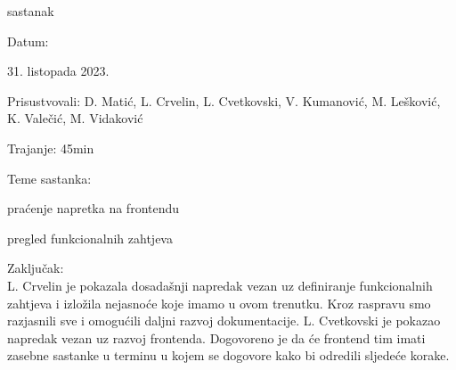 \begin{packed_enum}
            \item  sastanak
			\item[] \begin{packed_item}
				\item Datum: \date[{31. listopada 2023.}
				\item Prisustvovali:  D. Matić, L. Crvelin, L. Cvetkovski, V. Kumanović, M. Lešković, K. Valečić, M. Vidaković
				\item Trajanje: 45min
				\item Teme sastanka:
				\begin{packed_item}
					\item  praćenje napretka na frontendu
					\item  pregled funkcionalnih zahtjeva
				\end{packed_item}
                \item Zaključak: \\
                L. Crvelin je pokazala dosadašnji napredak vezan uz definiranje funkcionalnih zahtjeva i izložila nejasnoće koje imamo u ovom trenutku. Kroz raspravu smo razjasnili sve i omogućili daljni razvoj dokumentacije.
                L. Cvetkovski je pokazao napredak vezan uz razvoj frontenda. Dogovoreno je da će frontend tim imati zasebne sastanke u terminu u kojem se dogovore kako bi odredili sljedeće korake.
            
			\end{packed_item}


\end{packed_enum}
